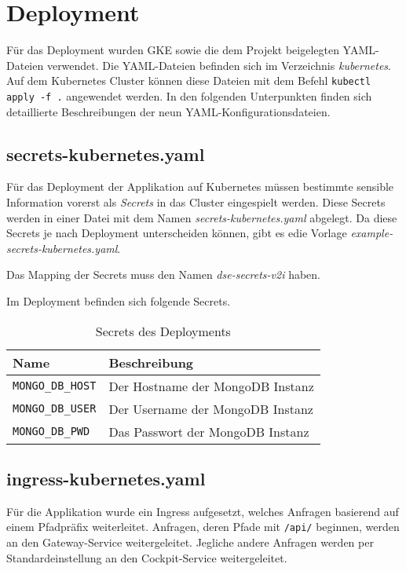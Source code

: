 \section{Deployment}

Für das Deployment wurden GKE sowie die dem Projekt beigelegten YAML-Dateien verwendet.
Die YAML-Dateien befinden sich im Verzeichnis \textit{kubernetes}.
Auf dem Kubernetes Cluster können diese Dateien mit dem Befehl \verb|kubectl apply -f .| angewendet werden. 
In den folgenden Unterpunkten finden sich detaillierte Beschreibungen der neun YAML-Konfigurations\-dateien.

\subsection{secrets-kubernetes.yaml}

Für das Deployment der Applikation auf Kubernetes müssen bestimmte sensible Information vorerst als \textit{Secrets} in das Cluster eingespielt werden.
Diese Secrets werden in einer Datei mit dem Namen \textit{secrets-kubernetes.yaml} abgelegt.
Da diese Secrets je nach Deployment unterscheiden können, gibt es edie Vorlage \textit{example-secrets-kubernetes.yaml}. 

Das Mapping der Secrets muss den Namen \textit{dse-secrets-v2i} haben.

Im Deployment befinden sich folgende Secrets.

\begin{table}[h]
	\begin{tabular}{|l|l|}
		\hline
		Name & Beschreibung \\ \hline
		\verb|MONGO_DB_HOST| &  Der Hostname der MongoDB Instanz  \\ \hline
		\verb|MONGO_DB_USER| &  Der Username der MongoDB Instanz  \\ \hline
		\verb|MONGO_DB_PWD|  &  Das Passwort der MongoDB Instanz  \\ \hline
	\end{tabular}
	\caption{Secrets des Deployments}
\end{table}

\subsection{ingress-kubernetes.yaml}

Für die Applikation wurde ein Ingress aufgesetzt, welches Anfragen basierend auf einem Pfadpräfix weiterleitet. 
Anfragen, deren Pfade mit \verb|/api/| beginnen, werden an den Gateway-Service weitergeleitet.
Jegliche andere Anfragen werden per Standardeinstellung an den Cockpit-Service weitergeleitet.

